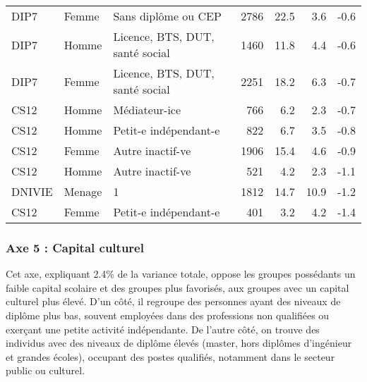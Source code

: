 \documentclass[
  12pt,
]{book}
\begin{document}
\begin{longtable}[t]{lllrrrr}
\addlinespace
DIP7 & Femme & Sans diplôme ou CEP & 2786 & 22.5 & 3.6 & -0.6\\
DIP7 & Homme & Licence, BTS, DUT, santé social & 1460 & 11.8 & 4.4 & -0.6\\
DIP7 & Femme & Licence, BTS, DUT, santé social & 2251 & 18.2 & 6.3 & -0.7\\
CS12 & Homme & Médiateur-ice & 766 & 6.2 & 2.3 & -0.7\\
CS12 & Homme & Petit-e indépendant-e & 822 & 6.7 & 3.5 & -0.8\\
\addlinespace
CS12 & Femme & Autre inactif-ve & 1906 & 15.4 & 4.6 & -0.9\\
CS12 & Homme & Autre inactif-ve & 521 & 4.2 & 2.3 & -1.1\\
DNIVIE & Menage & 1 & 1812 & 14.7 & 10.9 & -1.2\\
CS12 & Femme & Petit-e indépendant-e & 401 & 3.2 & 4.2 & -1.4\\*
\end{longtable}
\endgroup{}

\subsubsection{Axe 5 : Capital culturel}\label{axe-5-capital-culturel}

Cet axe, expliquant 2.4\% de la variance totale, oppose les groupes
possédants un faible capital scolaire et des groupes plus favorisés, aux
groupes avec un capital culturel plus élevé. D'un côté, il regroupe des
personnes ayant des niveaux de diplôme plus bas, souvent employées dans
des professions non qualifiées ou exerçant une petite activité
indépendante. De l'autre côté, on trouve des individus avec des niveaux
de diplôme élevés (master, hors diplômes d'ingénieur et grandes écoles),
occupant des postes qualifiés, notamment dans le secteur public ou
culturel.

\begingroup\fontsize{7}{9}\selectfont
\end{document}
